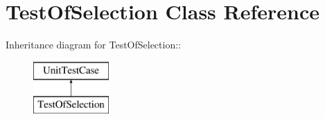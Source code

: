\hypertarget{class_test_of_selection}{
\section{TestOfSelection Class Reference}
\label{class_test_of_selection}
}
Inheritance diagram for TestOfSelection::\begin{figure}[H]
\begin{center}
\leavevmode
\includegraphics[height=2cm]{class_test_of_selection}
\end{center}
\end{figure}
